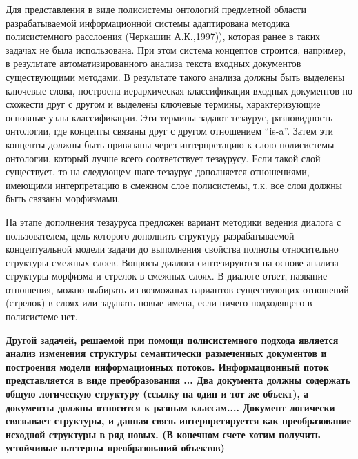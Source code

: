 \documentclass[12pt,a4paper]{ltxdoc}
\begin{document}
Для представления в виде полисистемы онтологий предметной области разрабатываемой информационной системы адаптирована методика полисистемного расслоения (Черкашин А.К.,1997)), которая ранее в таких задачах не была использована. При этом система концептов строится, например, в результате автоматизированного анализа текста входных документов существующими методами. В результате такого анализа должны быть выделены ключевые слова, построена иерархическая классификация входных документов по схожести друг с другом и выделены ключевые термины, характеризующие основные узлы классификации. Эти термины задают тезаурус, разновидность онтологии, где концепты связаны друг с другом отношением ``is-a''.  Затем эти концепты должны быть привязаны через интерпретацию к слою полисистемы онтологии, который лучше всего соответствует тезаурусу. Если такой слой существует, то на следующем шаге тезаурус дополняется отношениями, имеющими интерпретацию в смежном слое полисистемы, т.к. все слои должны быть связаны морфизмами.

На этапе дополнения тезауруса предложен вариант методики ведения диалога с пользователем, цель которого дополнить структуру разрабатываемой концептуальной модели задачи до выполнения свойства полноты относительно структуры смежных слоев. Вопросы диалога синтезируются на основе анализа структуры морфизма и стрелок в смежных слоях. В диалоге ответ, название отношения, можно выбирать из возможных вариантов существующих отношений (стрелок) в слоях или задавать новые имена, если ничего подходящего в полисистеме нет.

{\bfseries Другой задачей, решаемой при помощи полисистемного подхода является анализ изменения структуры семантически размеченных документов и построения модели информационных потоков. Информационный поток представляется в виде преобразования ... Два документа должны содержать общую логическую структуру (ссылку на один и тот же объект), а документы должны относится к разным классам.... Документ логически связывает структуры, и данная связь интерпретируется как преобразование исходной структуры в ряд новых. (В конечном счете хотим получить устойчивые паттерны преобразований объектов)
}
\end{document}
